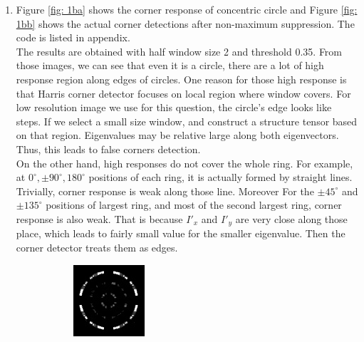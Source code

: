 \documentclass[12pt]{article}
\begin{document}
\begin{enumerate}
\begin{enumerate}
	\item Figure \ref{fig: 1ba} shows the corner response of concentric circle and Figure \ref{fig: 1bb} shows the actual corner detections after non-maximum suppression. The code is listed in appendix.\\
	The results are obtained with half window size 2 and threshold 0.35. From those images, we can see that even it is a circle, there are a lot of high response region along edges of circles. One reason for those high response is that Harris corner detector focuses on local region where window covers. For low resolution image we use for this question, the circle's edge looks like steps. If we select a small size window, and construct a structure tensor based on that region. Eigenvalues may be relative large along both eigenvectors. Thus, this leads to false corners detection.\\
	On the other hand, high responses do not cover the whole ring. For example, at $0^\circ,\pm90^\circ,180^\circ$ positions of each ring, it is actually formed by straight lines. Trivially, corner response is weak along those line. Moreover For the $\pm 45^\circ $ and $\pm135^\circ$ positions of largest ring, and most of the second largest ring, corner response is also weak. That is because $I'_x$ and $I'_y$ are very close along those place, which leads to fairly small value for the smaller eigenvalue. Then the corner detector treats them as edges. 
	\begin{figure}[H]
		\centering
		\begin{subfigure}[t]{0.5\textwidth}
			\centering
			\includegraphics[width=\textwidth]{response_img_circle}

\end{subfigure}
\end{figure}
\end{enumerate}
\end{enumerate}
\end{document}
